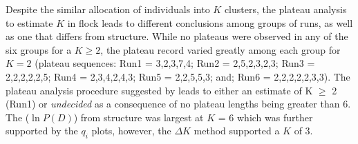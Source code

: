Despite the similar allocation of individuals into $K$ clusters, the 
plateau analysis to estimate $K$ in {\sc flock} leads to different conclusions among groups of runs, as well as 
one that differs from {\sc structure}. While no plateaus were observed in any of the six groups 
for a $K\geq 2$, the plateau record varied greatly among each
group for $K = 2$ (plateau sequences: Run1 = 3,2,3,7,4; Run2 = 2,5,2,3,2,3; Run3 = 2,2,2,2,2,5; 
Run4 = 2,3,4,2,4,3; Run5 = 2,2,5,5,3; and; Run6 = 2,2,2,2,2,3,3). The plateau analysis 
procedure suggested by \citet{Duc&Tur2012} leads to
either an estimate of K $\geq$ 2 (Run1) or {\em undecided} as a consequence of no plateau 
lengths being greater than 6. The ($\ln P(D)$) from {\sc structure}
was largest at $K$ = 6 which was further supported by the $q_i$ plots, however,
the $\Delta K$ method supported a $K$ of 3.
 


